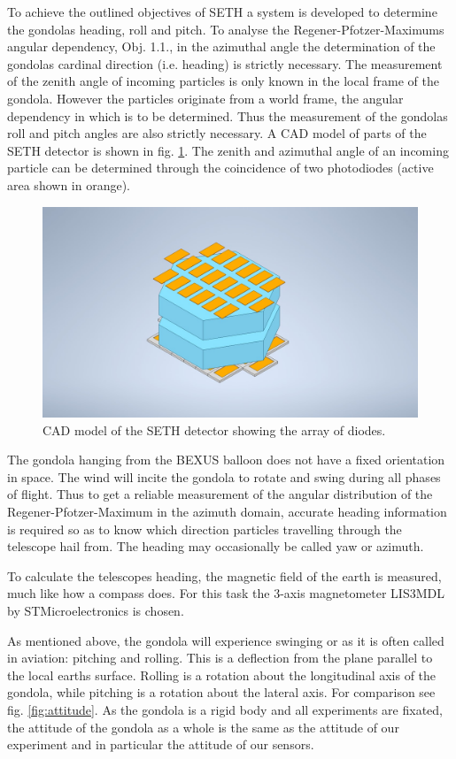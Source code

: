 To achieve the outlined objectives of \ac{SETH} a system is developed to determine the gondolas heading, roll and pitch. To analyse the Regener-Pfotzer-Maximums angular dependency, Obj. 1.1., in the azimuthal angle the determination of the gondolas cardinal direction (i.e. heading) is strictly necessary. The measurement of the zenith angle of incoming particles is only known in the local frame of the gondola. However the particles originate from a world frame, the angular dependency in which is to be determined. Thus the measurement of the gondolas roll and pitch angles are also strictly necessary. A \ac{CAD} model of parts of the \ac{SETH} detector is shown in fig. \ref{fig:seth_cad}. The zenith and azimuthal angle of an incoming particle can be determined through the coincidence of two photodiodes (active area shown in orange).

\begin{figure}[H]
    \centering
    \includegraphics[width=0.5\linewidth, trim = {5cm 0cm 5cm 0cm}, clip]{images/01_background/SETH-Sketch.jpeg}
    \caption[\ac{SETH} detector sketch]{\ac{CAD} model of the \ac{SETH} detector showing the array of diodes.}
    \label{fig:seth_cad}
\end{figure}

The gondola hanging from the \ac{BEXUS} balloon does not have a fixed orientation in space. The wind will incite the gondola to rotate and swing during all phases of flight. Thus to get a reliable measurement of the angular distribution of the Regener-Pfotzer-Maximum in the azimuth domain, accurate heading information is required so as to know which direction particles travelling through the telescope hail from. The heading may occasionally be called yaw or azimuth.


To calculate the telescopes heading, the magnetic field of the earth is measured, much like how a compass does. For this task the 3-axis magnetometer LIS3MDL by STMicroelectronics is chosen.

As mentioned above, the gondola will experience swinging or as it is often called in aviation: pitching and rolling. This is a deflection from the plane parallel to the local earths surface. Rolling is a rotation about the longitudinal axis of the gondola, while pitching is a rotation about the lateral axis. For comparison see fig. \ref{fig:attitude}. As the gondola is a rigid body and all experiments are fixated, the attitude of the gondola as a whole is the same as the attitude of our experiment and in particular the attitude of our sensors.

